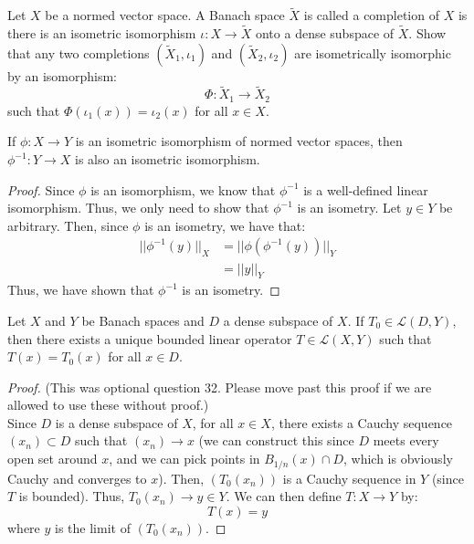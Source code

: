 \documentclass[12pt]{article}
\begin{document}
\begin{problem}{38}
    Let $X$ be a normed vector space. A Banach space $\tilde{X}$ is called a completion of $X$ is there is an isometric isomorphism $\iota: X \to \tilde{X}$ onto a dense subspace of $\tilde{X}$. Show that any two completions $(\tilde{X}_1, \iota_1)$ and $(\tilde{X}_2, \iota_2)$ are isometrically isomorphic by an isomorphism: 
    \[ \Phi: \tilde{X}_1 \to \tilde{X}_2\]
    such that $\Phi(\iota_1(x)) = \iota_2(x)$ for all $x \in X$. 
\end{problem}
\begin{solution}
    \begin{lemma}
        If $\phi: X \to Y$ is an isometric isomorphism of normed vector spaces, then $\phi^{-1}: Y \to X$ is also an isometric isomorphism.
    \end{lemma}
    \begin{proof}
        Since $\phi$ is an isomorphism, we know that $\phi^{-1}$ is a well-defined linear isomorphism. Thus, we only need to show that $\phi^{-1}$ is an isometry. \bbni
        Let $y \in Y$ be arbitrary. Then, since $\phi$ is an isometry, we have that:
        \begin{align*}
            ||\phi^{-1}(y)||_X &= ||\phi (\phi^{-1}(y))||_Y \\
            &= ||y||_Y
        \end{align*}
        Thus, we have shown that $\phi^{-1}$ is an isometry.
    \end{proof}
    \begin{lemma}
        Let $X$ and $Y$ be Banach spaces and $D$ a dense subspace of $X$. If $T_0 \in \mathcal{L}(D, Y)$, then there exists a unique bounded linear operator $T \in \mathcal{L}(X, Y)$ such that $T(x) = T_0(x)$ for all $x \in D$.
    \end{lemma}
    \begin{proof}
        (This was optional question 32. Please move past this proof if we are allowed to use these without proof.) \\
        Since $D$ is a dense subspace of $X$, for all $x \in X$, there exists a Cauchy sequence $(x_n) \subset D$ such that $(x_n) \to x$ (we can construct this since $D$ meets every open set around $x$, and we can pick points in $B_{1/n}(x) \cap D$, which is obviously Cauchy and converges to $x$). Then, $(T_0(x_n))$ is a Cauchy sequence in $Y$ (since $T$ is bounded). Thus, $T_0(x_n) \to y \in Y$. We can then define $T: X \to Y$ by:
        \[T(x) = y\]
        where $y$ is the limit of $(T_0(x_n))$. \bbni

\end{proof}
\end{solution}
\end{document}
